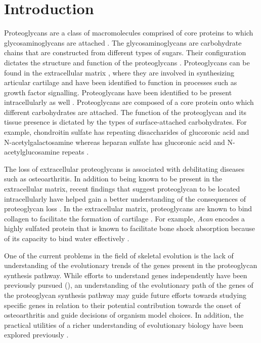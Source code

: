\documentclass{article}
\begin{document}
\section{Introduction}
Proteoglycans are a class of macromolecules comprised of core proteins to which glycosaminoglycans are attached \cite{pg_struct_func}. The glycosaminoglycans are carbohydrate chains that are constructed from different types of sugars. Their configuration dictates the structure and function of the proteoglycans \cite{pg_chapter}. Proteoglycans can be found in the extracellular matrix \cite{pg_aggrecan}, where they are involved in synthesizing articular cartilage and have been identified to function in processes such as growth factor signalling. Proteoglycans have been identified to be present intracellularly as well \cite{pg_intro}. Proteoglycans are composed of a core protein onto which different carbohydrates are attached. The function of the proteoglycan and its tissue presence is dictated by the types of surface-attached carbohydrates. For example, chondroitin sulfate has repeating disaccharides of glucoronic acid and N-acetylgalactosamine whereas heparan sulfate has glucoronic acid and N-acetylglucosamine repeats \cite{pg_chapter}.

The loss of extracellular proteoglycans is associated with debilitating diseases such as osteoarthritis. In addition to being known to be present in the extracellular matrix, recent findings that suggest proteoglycan to be located intracellularly have helped gain a better understanding of the consequences of proteoglycan loss \cite{pg_intro, osteo1, proteo_osteo1}. In the extracellular matrix, proteoglycans are known to bind collagen to facilitate the formation of cartilage \cite{proteo_osteo2, proteo_osteo3}. For example, \textit{Acan} encodes a highly sulfated protein that is known to facilitate bone shock absorption because of its capacity to bind water effectively \cite{proteo_osteo1, proteo_osteo3, proteo_form_function}. 

One of the current problems in the field of skeletal evolution is the lack of understanding of the evolutionary trends of the genes present in the proteoglycan synthesis pathway. While efforts to understand genes independently have been previously pursued (\cite{fam20}), an understanding of the evolutionary path of the genes of the proteoglycan synthesis pathway may guide future efforts towards studying specific genes in relation to their potential contribution towards the onset of osteoarthritis and guide decisions of organism model choices. In addition, the practical utilities of a richer understanding of evolutionary biology have been explored previously \cite{evobio}.
\end{document}
